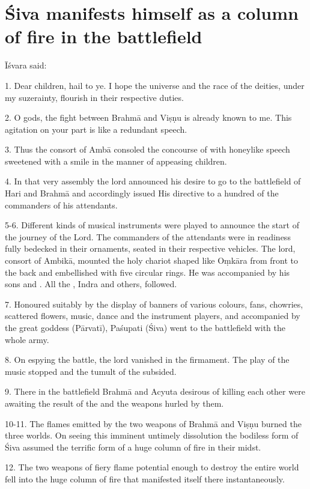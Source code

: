 \chapter{Śiva manifests himself as a column of fire in the battlefield}

Īśvara said:

1. Dear children, hail to ye. I hope the universe and the race of the deities,
under my suzerainty, flourish in their respective duties.

2. O gods, the fight between Brahmā and Viṣṇu is already known to me. This
agitation on your part is like a redundant speech.

3. Thus the consort of Ambā consoled the concourse of  with honeylike
speech sweetened with a smile in the manner of appeasing children.

4. In that very assembly the lord announced his desire to go to the battlefield
of Hari and Brahmā and accordingly issued His directive to a hundred of
the commanders of his attendants.

5-6. Different kinds of musical instruments were played to announce the start of
the journey of the Lord. The commanders of the attendants were in readiness
fully bedecked in their ornaments, seated in their respective vehicles. The lord,
consort of Ambikā, mounted the holy chariot shaped like Oṃkāra from front to
the back and embellished with five circular rings. He was accompanied by his
sons and . All the , Indra and others, followed.

7. Honoured suitably by the display of banners of various colours, fans,
chowries, scattered flowers, music, dance and the instrument players, and
accompanied by the great goddess (Pārvatī), Paśupati (Śiva) went to
the battlefield with the whole army.

8. On espying the battle, the lord vanished in the firmament. The play of
the music stopped and the tumult of the  subsided.

9. There in the battlefield Brahmā and Acyuta desirous of killing each other
were awaiting the result of the  and the  weapons
hurled by them.

10-11. The flames emitted by the two weapons of Brahmā and Viṣṇu burned
the three worlds. On seeing this imminent untimely dissolution the bodiless form
of Śiva assumed the terrific form of a huge column of fire in their midst.

12. The two weapons of fiery flame potential enough to destroy the entire world
fell into the huge column of fire that manifested itself there instantaneously.

